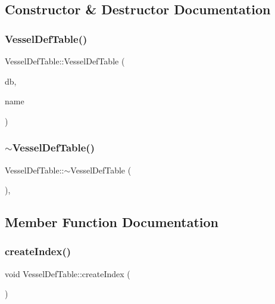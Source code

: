 \subsection{Constructor \& Destructor Documentation}
\mbox{\label{class_vessel_def_table_ae53e48fba0d34fd040f76ab129f74c90}} 
\subsubsection{\texorpdfstring{VesselDefTable()}{VesselDefTable()}}
{\footnotesize\ttfamily Vessel\+Def\+Table\+::\+Vessel\+Def\+Table (\begin{DoxyParamCaption}\item[{std\+::shared\+\_\+ptr$<$ sqlite\+::\+S\+Q\+Lite\+Storage $>$}]{db,  }\item[{std\+::string}]{name }\end{DoxyParamCaption})}

\mbox{\label{class_vessel_def_table_aa5e4705621fdc032c63afc31da38e4f5}} 
\subsubsection{\texorpdfstring{$\sim$VesselDefTable()}{~VesselDefTable()}}
{\footnotesize\ttfamily Vessel\+Def\+Table\+::$\sim$\+Vessel\+Def\+Table (\begin{DoxyParamCaption}{ }\end{DoxyParamCaption})\hspace{0.3cm}{\ttfamily [default]}, {\ttfamily [noexcept]}}



\subsection{Member Function Documentation}
\mbox{\label{class_vessel_def_table_a8709b9d8fb2aedcc726ebfcc65f041d9}} 
\subsubsection{\texorpdfstring{createIndex()}{createIndex()}}
{\footnotesize\ttfamily void Vessel\+Def\+Table\+::create\+Index (\begin{DoxyParamCaption}{ }\end{DoxyParamCaption})}

